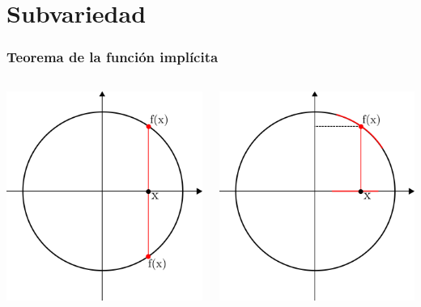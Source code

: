 \documentclass{beamer}
\begin{document}
\section{Subvariedad}
\begin{frame}
    \frametitle{Teorema de la funci\'on impl\'icita}
    \begin{columns}
        \begin{center}
            \includegraphics[scale=0.3]{../gfx/unit-circle1}
        \end{center}
        \begin{center}
            \includegraphics[scale=0.3]{../gfx/unit-circle2}

\end{center}
\end{columns}
\end{frame}
\end{document}
